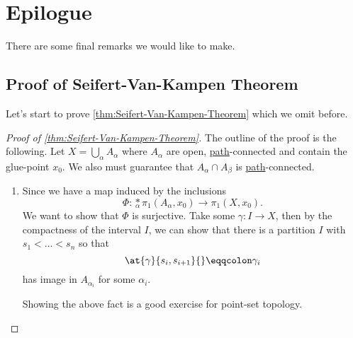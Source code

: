\chapter{Epilogue}
There are some final remarks we would like to make.
\section{Proof of Seifert-Van-Kampen Theorem}
Let's start to prove \autoref{thm:Seifert-Van-Kampen-Theorem} which we omit before.
\begin{proof}[Proof of \autoref{thm:Seifert-Van-Kampen-Theorem}]\label{pf:thm:Seifert-Van-Kampen-Theorem}
	The outline of the proof is the following. Let \(X = \bigcup_{\alpha}A_\alpha \) where \(A_\alpha \) are open, \hyperref[def:path]{path}-connected
	and contain the glue-point \(x_0\). We also must guarantee that \(A_\alpha \cap A_\beta \) is \hyperref[def:path]{path}-connected.

	\begin{enumerate}
		\item Since we have a map induced by the inclusions
		      \[
			      \Phi \colon \underset{\alpha}{\ast} \pi _1(A_\alpha , x_0)\to \pi _1(X, x_0).
		      \]
		      We want to show that \(\Phi \) is surjective. Take some \(\gamma \colon I\to X\), then by the compactness of the interval \(I\), we can
		      show that there is a partition \(I\) with \(s_1<\dots <s_n \) so that
		      \[
			      \at{\gamma }{s_{i}, s_{i+1}}{} \eqqcolon \gamma _{i}
		      \]
		      has image in \(A_{\alpha_{i}}\) for some \(\alpha _{i}\).

		      \begin{exercise}
			      Showing the above fact is a good exercise for point-set topology.
		      \end{exercise}


\end{enumerate}
\end{proof}
